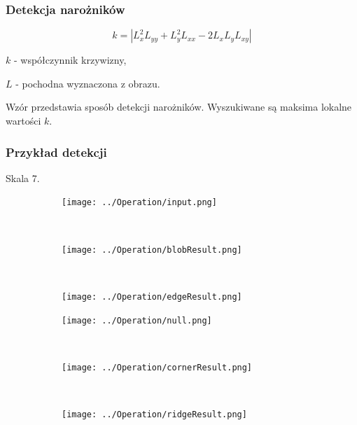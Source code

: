 \begin{frame}
	\frametitle{Detekcja narożników}



	$$ k = |L_x^2L_{yy}  + L_y^2L_{xx} - 2L_xL_yL_{xy}| $$

	$ k $ - współczynnik krzywizny,

	$ L $ - pochodna wyznaczona z obrazu.


	Wzór przedstawia sposób detekcji narożników. Wyszukiwane są maksima lokalne wartości $ k $.


\end{frame}
\begin{frame}
	\frametitle{Przykład detekcji}
Skala 7.
	\begin{figure}[h]
		\begin{center}

			\begin{subfigure}[b]{3cm}
				\centering
				\texttt{[image: ../Operation/input.png]}
			\end{subfigure}~
			\begin{subfigure}[b]{3cm}
				\centering
				\texttt{[image: ../Operation/blobResult.png]}
			\end{subfigure}~
			\begin{subfigure}[b]{3cm}
				\centering
				\texttt{[image: ../Operation/edgeResult.png]}
			\end{subfigure}

			\begin{subfigure}[b]{3cm}
				\centering
				\texttt{[image: ../Operation/null.png]}
			\end{subfigure}~
			\begin{subfigure}[b]{3cm}
				\centering
				\texttt{[image: ../Operation/cornerResult.png]}
			\end{subfigure}~
			\begin{subfigure}[b]{3cm}
				\centering
				\texttt{[image: ../Operation/ridgeResult.png]}
			\end{subfigure}
			\label{fig:wynik}
		\end{center}
	\end{figure}

\end{frame}
